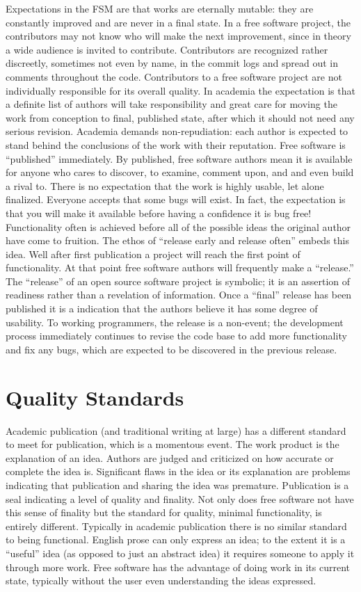 \documentclass[
	fontsize=10pt, %
	twoside=false, %
	secnumdepth=1, %
]{kaobook}
\begin{document}
Expectations in the FSM are that works are eternally mutable: they are
constantly improved and are never in a final state. In a free software
project, the contributors may not know who will make the next
improvement, since in theory a wide audience is invited to
contribute. Contributors are recognized rather discreetly, sometimes
not even by name, in the commit logs and spread out in comments
throughout the code. Contributors to a free software project are not
individually responsible for its overall quality.  In academia the
expectation is that a definite list of authors will take
responsibility and great care for moving the work from conception to
final, published state, after which it should not need any serious
revision. Academia demands non-repudiation: each author is expected to
stand behind the conclusions of the work with their reputation.  Free
software is “published” immediately. By published, free software
authors mean it is available for anyone who cares to discover, to
examine, comment upon, and and even build a rival to. There is no
expectation that the work is highly usable, let alone
finalized. Everyone accepts that some bugs will exist. In fact, the
expectation is that you will make it available before having a
confidence it is bug free! Functionality often is achieved before all
of the possible ideas the original author have come to fruition. The
ethos of “release early and release often” embeds this idea. Well
after first publication a project will reach the first point of
functionality. At that point free software authors will frequently
make a “release.” The “release” of an open source software project is
symbolic; it is an assertion of readiness rather than a revelation of
information. Once a “final” release has been published it is a
indication that the authors believe it has some degree of
usability. To working programmers, the release is a non-event; the
development process immediately continues to revise the code base to
add more functionality and fix any bugs, which are expected to be
discovered in the previous release.

\section{Quality Standards}

Academic publication (and traditional writing at large) has a
different standard to meet for publication, which is a momentous
event. The work product is the explanation of an idea. Authors are
judged and criticized on how accurate or complete the idea
is. Significant flaws in the idea or its explanation are problems
indicating that publication and sharing the idea was
premature. Publication is a seal indicating a level of quality and
finality. Not only does free software not have this sense of finality
but the standard for quality, minimal functionality, is entirely
different. Typically in academic publication there is no similar
standard to being functional. English prose can only express an idea;
to the extent it is a “useful” idea (as opposed to just an abstract
idea) it requires someone to apply it through more work. Free software
has the advantage of doing work in its current state, typically
without the user even understanding the ideas expressed.
\end{document}
